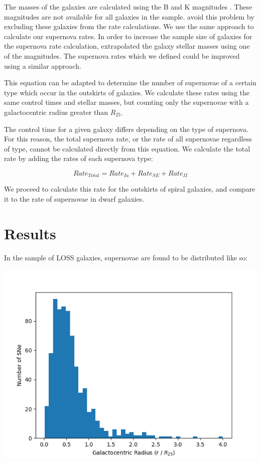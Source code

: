 \documentclass[apj]{emulateapj}
\begin{document}
The masses of the galaxies are calculated using the B and K magnitudes \citep{Leaman11} \citep{Graur17}. These magnitudes are not available for all galaxies in the sample. \citet{Leaman11} avoid this problem by excluding these galaxies from the rate calculations. We use the same approach to calculate our supernova rates. In order to increase the sample size of galaxies for the supernova rate calculation, \citet{Graur17} extrapolated the galaxy stellar masses using one of the magnitudes. The supernova rates which we defined could be improved using a similar approach.

This equation can be adapted to determine the number of supernovae of a certain type which occur in the outskirts of galaxies. We calculate these rates using the same control times and stellar masses, but counting only the supernovae with a galactocentric radius greater than $R_{25}$.

The control time for a given galaxy differs depending on the type of supernova. For this reason, the total supernova rate, or the rate of all supernovae regardless of type, cannot be calculated directly from this equation. We calculate the total rate by adding the rates of each supernova type:

\begin{equation}
Rate_{Total}=Rate_{Ia}+Rate_{SE}+Rate_{II}
\end{equation}

We proceed to calculate this rate for the outskirts of spiral galaxies, and compare it to the rate of supernovae in dwarf galaxies.

\section{Results}

In the sample of LOSS galaxies, supernovae are found to be distributed like so:

\includegraphics[scale=0.5]{sne_vs_radius}
\end{document}
